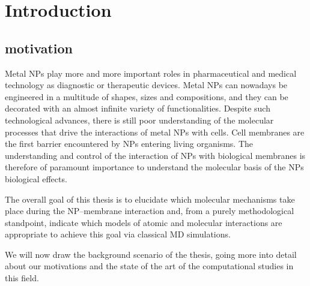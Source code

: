 \chapter{Introduction}
%
%
%

\begingroup
\toclesssection
\introductionStyle

\section{motivation}
Metal \acp{NP} play more and more important roles in pharmaceutical and medical technology as diagnostic or therapeutic devices. Metal \acp{NP} can nowadays be engineered in a multitude of shapes, sizes and compositions, and they can be decorated with an almost infinite variety of functionalities. Despite such technological advances, there is still poor understanding of the molecular processes that drive the interactions of metal \acp{NP} with cells. Cell membranes are the first barrier encountered by \acp{NP} entering living organisms. The understanding and control of the interaction of \acp{NP} with biological membranes is therefore of paramount importance to understand the molecular basis of the \acp{NP} biological effects.

The overall goal of this thesis is to elucidate which molecular mechanisms take place during the \ac{NP}--membrane interaction and, from a purely methodological standpoint, indicate which models of atomic and molecular interactions are appropriate to achieve this goal via classical \ac{MD} simulations. 

We will now draw the background scenario of the thesis, going more into detail about our motivations and the state of the art of the computational studies in this field.

